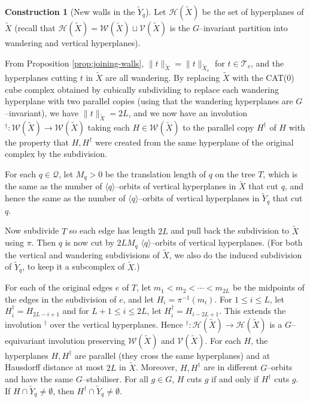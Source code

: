 \documentclass[11pt,oneside]{amsart}
\theoremstyle{definition}
\newtheorem{cons}[thm]{Construction}
\begin{document}
\begin{cons}[New walls in the $\widetilde Y_q$]\label{cons:B6-walls}
Let $\mathcal H(\widetilde X)$ be the set of hyperplanes of $\widetilde X$ (recall that $\mathcal H(\widetilde X)=\mathcal W(\widetilde X)\sqcup\mathcal V(\widetilde X)$ is the $G$--invariant partition into wandering and vertical hyperplanes).

From Proposition \ref{prop:joining-walls}, $\|t\|_{\widetilde X}=\|t\|_{\widetilde X_v}$ for $t\in\mathcal T_v$, and the hyperplanes cutting $t$ in $\widetilde X$ are all wandering.  By replacing $\widetilde X$ with the CAT(0) cube complex obtained by cubically subdividing to replace each wandering hyperplane with two parallel copies (using that the wandering hyperplanes are $G$--invariant), we have $\|t\|_{\widetilde X}=2L$, and we now have an involution ${}^\dagger:\mathcal W(\widetilde X)\to\mathcal W(\widetilde X)$ taking each $H\in\mathcal W(\widetilde X)$ to the parallel copy $H^\dagger$ of $H$ with the property that $H,H^\dagger$ were created from the same hyperplane of the original complex by the subdivision.

For each $q\in\mathcal Q$, let $M_q>0$ be the translation length of $q$ on the tree $T$, which is the same as the number of $\langle q\rangle$--orbits of vertical hyperplanes in $\widetilde X$ that cut $q$, and hence the same as the number of $\langle q\rangle$--orbits of vertical hyperplanes in $\widetilde Y_q$ that cut $q$.

Now subdivide $T$ so each edge has length $2L$ and pull back the subdivision to $\widetilde X$ using $\pi$.  Then $q$ is now cut by $2LM_q$ $\langle q\rangle$--orbits of vertical hyperplanes.  (For both the vertical and  wandering subdivisions of $\widetilde X$, we also do the induced subdivision of $\widetilde Y_q$, to keep it a subcomplex of $\widetilde X$.)

For each of the original edges $e$ of $T$, let $m_1<m_2<\cdots < m_{2L}$ be the midpoints of the edges in the subdivision of $e$, and let $H_i=\pi^{-1}(m_i)$.  For $1\leq i\leq L$, let $H_i^\dagger=H_{2L-i+1}$ and for $L+1\leq i\leq 2L$, let $H_i^\dagger=H_{i-2L+1}$.  This extends the involution ${}^\dagger$ over the vertical hyperplanes.  Hence ${}^\dagger:\mathcal H(\widetilde X)\to\mathcal H(\widetilde X)$ is a $G$--equivariant involution preserving $\mathcal W(\widetilde X)$ and $\mathcal V(\widetilde X)$.  For each $H$, the hyperplanes $H,H^\dagger$ are parallel (they cross the same hyperplanes) and  at Hausdorff distance at most $2L$ in $\widetilde X$.  Moreover, $H,H^\dagger$ are in different $G$--orbits and have the same $G$--stabiliser.   For all $g\in G$, $H$ cuts $g$ if and only if $H^\dagger$ cuts $g$. If $H\cap \widetilde Y_q\neq\emptyset$, then $H^\dagger\cap\widetilde Y_q\neq\emptyset$.


\end{cons}
\end{document}
